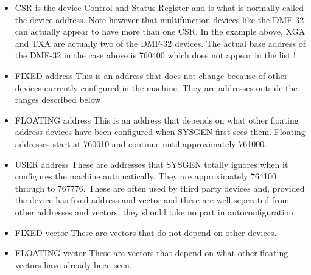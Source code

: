 \begin{itemize}
\item{CSR} is the device Control and Status Register and is what is
 normally called the device address.
 Note however that multifunction devices like the DMF-32 can actually appear
 to have more than one CSR.
 In the example above, XGA and TXA are actually two of the DMF-32
 devices.
 The actual base address of the DMF-32 in the case above is 760400
 which does not appear in the list !

\item{FIXED address} This is an address that does not change because of
 other devices currently configured in the machine.
They are addresses outside the ranges described below.

\item{FLOATING address} This is an address that depends on what other
 floating address devices have been configured when SYSGEN first sees them.
 Floating addresses start at 760010 and continue until approximately
 761000.

\item{USER address} These are addresses that SYSGEN totally ignores when it
 configures the machine automatically.
They are approximately 764100 through to 767776.
These are often used by third party devices and, provided the device has
fixed address and vector and these are well seperated from other 
addresses and vectors, they should take no part in autoconfiguration.

\item{FIXED vector} These are vectors that do not depend on other devices.

\item{FLOATING vector} These are vectors that depend on what other floating
vectors have already been seen.
\end{itemize}


